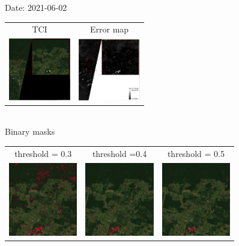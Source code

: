 \documentclass{beamer}
\begin{document}
\begin{frame}{Date: 2021-06-02}
    \centering
        \begin{tabular}{cc}
        TCI & Error map\\
        \includegraphics[width=2.7cm]{Figures/v3/20210602/TCI/tci_zoom2.pdf}
        &
        \includegraphics[width=2.7cm]{Figures/v3/20210602/error_map/error_zoom2.pdf}
    \end{tabular}
    \\
   \centering
    Binary masks
        \begin{tabular}{ccc}
            threshold = 0.3  & threshold =0.4 &  threshold = 0.5 \\
        \includegraphics[width=3cm]{Figures/v3/20210602/umbral_03/zoom2.png}
        &
        \includegraphics[width=3cm]{Figures/v3/20210602/umbral_04/zoom2.png}
        &
        \includegraphics[width=3cm]{Figures/v3/20210602/umbral_05/zoom2.png}
        \end{tabular}
\end{frame}
\end{document}

